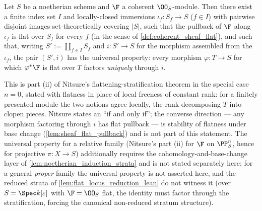 \begin{theorem}[Universal property of the flat-locus stratification (case
  \(n = 0\))]
  \label{thm:flattening_stratification_universal}
  \leanok
  Let \(S\) be a noetherian scheme and \(\F\) a coherent \(\OO_S\)-module.
  Then there exist a finite index set \(I\) and locally-closed immersions
  \(\iota_f : S_f \to S\) (\(f \in I\)) with pairwise disjoint images
  set-theoretically covering \(|S|\), such that the pullback of \(\F\)
  along \(\iota_f\) is flat over \(S_f\) for every \(f\) (in the sense of
  \cref{def:coherent_sheaf_flat}), and such that, writing
  \(S' := \coprod_{f \in I} S_f\) and \(i : S' \to S\) for the morphism
  assembled from the \(\iota_f\), the pair \((S', i)\) has the universal
  property: every morphism \(\varphi : T \to S\) for which
  \(\varphi^* \F\) is flat over \(T\) factors \emph{uniquely} through
  \(i\).

  This is part (ii) of Nitsure's flattening-stratification theorem in the
  special case \(n = 0\), stated with flatness in place of local freeness of
  constant rank: for a finitely presented module the two notions agree
  locally, the rank decomposing \(T\) into clopen pieces.  Nitsure states an
  ``if and only if''; the converse direction --- any morphism factoring
  through \(i\) has flat pullback --- is stability of flatness under base
  change (\cref{lem:sheaf_flat_pullback}) and is not part of this statement.
  The universal property for a relative family (Nitsure's part (ii) for
  \(\F\) on \(\PP^n_S\), hence for projective \(\pi : X \to S\))
  additionally requires the cohomology-and-base-change layer of
  \cref{lem:noetherian_induction_strata} and is not stated separately here;
  for a general \emph{proper} family the universal property is not asserted
  here, and the reduced strata of \cref{lem:flat_locus_reduction_lean} do
  not witness it (over \(S = \Spec k[\varepsilon]\) with \(\F = \OO_S\)
  flat, the identity must factor through the stratification, forcing the
  canonical non-reduced stratum structure).
\end{theorem}

